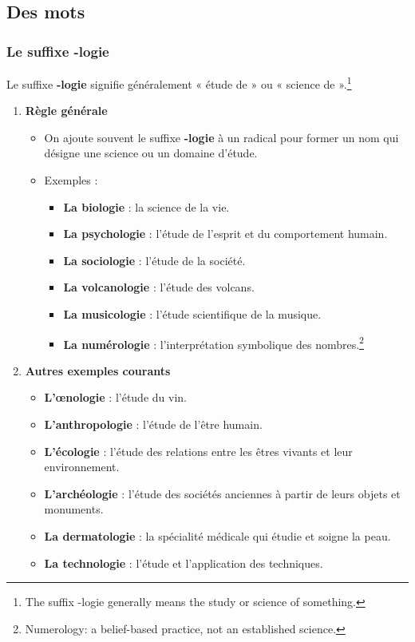 \documentclass[math,code]{amznotes}
\theoremstyle{remark}
\begin{document}
\subsection*{Des mots}

\subsubsection*{Le suffixe -logie}

Le suffixe \textbf{-logie} signifie généralement « étude de » ou « science de ».\footnote{The suffix -logie generally means the study or science of something.}

\begin{enumerate}
    \item \textbf{Règle générale}
    \begin{itemize}
        \item On ajoute souvent le suffixe \textbf{-logie} à un radical pour former un nom qui désigne une science ou un domaine d'étude.
        \item Exemples :
        \begin{itemize}
            \item \textbf{La biologie} : la science de la vie.
            \item \textbf{La psychologie} : l'étude de l'esprit et du comportement humain.
            \item \textbf{La sociologie} : l'étude de la société.
            \item \textbf{La volcanologie} : l'étude des volcans.
            \item \textbf{La musicologie} : l'étude scientifique de la musique.
            \item \textbf{La numérologie} : l'interprétation symbolique des nombres.\footnote{Numerology: a belief-based practice, not an established science.}
        \end{itemize}
    \end{itemize}

    \item \textbf{Autres exemples courants}
    \begin{itemize}
        \item \textbf{L'œnologie} : l'étude du vin.
        \item \textbf{L'anthropologie} : l'étude de l'être humain.
        \item \textbf{L'écologie} : l'étude des relations entre les êtres vivants et leur environnement.
        \item \textbf{L'archéologie} : l'étude des sociétés anciennes à partir de leurs objets et monuments.
        \item \textbf{La dermatologie} : la spécialité médicale qui étudie et soigne la peau.
        \item \textbf{La technologie} : l'étude et l'application des techniques.
    \end{itemize}


\end{enumerate}
\end{document}
